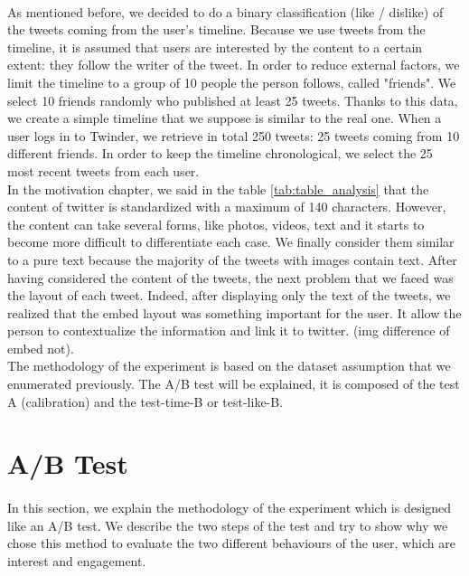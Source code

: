 \paragraph{}
As mentioned before, we decided to do a binary classification (like / dislike) of the tweets coming from the user's timeline. Because we use tweets from the timeline, it is assumed that users are interested by the content to a certain extent: they follow the writer of the tweet. In order to reduce external factors, we limit the timeline to a group of 10 people the person follows, called "friends". We select 10 friends randomly who published at least 25 tweets. Thanks to this data, we create a simple timeline that we suppose is similar to the real one. When a user logs in to Twinder, we retrieve in total 250 tweets: 25 tweets coming from 10 different friends. In order to keep the timeline chronological, we select the 25 most recent tweets from each user. \\
In the motivation chapter, we said in the table \ref{tab:table_analysis} that the content of twitter is standardized with a maximum of 140 characters. However, the content can take several forms, like photos, videos, text and it starts to become more difficult to differentiate each case. We finally consider them similar to a pure text because the majority of the tweets with images contain text. After having considered the content of the tweets, the next problem that we faced was the layout of each tweet. Indeed, after displaying only the text of the tweets, we realized that the embed layout was something important for the user. It allow the person to contextualize the information and link it to twitter. (img difference of embed not). \\
The methodology of the experiment is based on the dataset assumption that we enumerated previously. The A/B test will be explained, it is composed of the test A (calibration) and the test-time-B or test-like-B.  

\section{A/B Test}

\paragraph{}
In this section, we explain the methodology of the experiment which is designed like an A/B test. We describe the two steps of the test and try to show why we chose this method to evaluate the two different behaviours of the user, which are interest and engagement.

